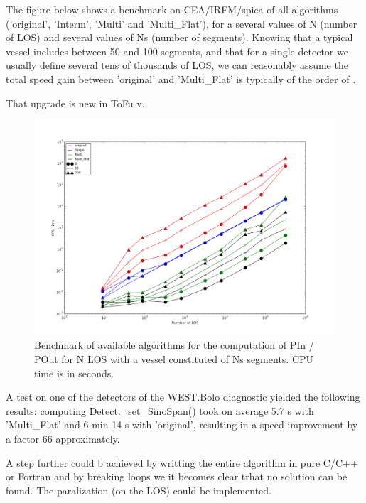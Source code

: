 \documentclass[a4paper,11pt,twoside,titlepage,openright]{book}
\numberwithin{equation}{section}
\begin{document}
The figure below shows a benchmark on CEA/IRFM/spica of all algorithms ('original', 'Interm', 'Multi' and 'Multi\_Flat'), for a several values of N (number of LOS) and several values of Ns (number of segments).
Knowing that a typical vessel includes between 50 and 100 segments, and that for a single detector we usually define several tens of thousands of LOS, we can reasonably assume the total speed gain between 'original' and 'Multi\_Flat' is typically of the order of .

That upgrade is new in ToFu v.

\begin{figure}
  \caption{Benchmark of available algorithms for the computation of PIn / POut for N LOS with a vessel constituted of Ns segments. CPU time is in seconds.}
  \centering
    \includegraphics[width=1.\textwidth]{Fig_Stats_Timing_Ref.png}
\end{figure}

A test on one of the detectors of the WEST.Bolo diagnostic yielded the following results: computing Detect.\_set\_SinoSpan() took on average 5.7 s with 'Multi\_Flat' and 6 min 14 s with 'original', resulting in a speed improvement by a factor 66 approximately.

A step further could b achieved by writting the entire algorithm in pure C/C++ or Fortran and by breaking loops we it becomes clear trhat no solution can be found. The paralization (on the LOS) could be implemented.






 


\appendix
\end{document}
